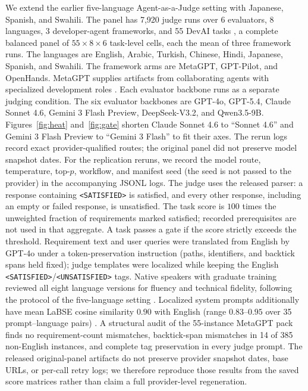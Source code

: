 \documentclass[sigconf,anonymous]{aamas}
\begin{document}
We extend the earlier five-language Agent-as-a-Judge setting
\citep{mahmood2026multilingualpromptlocalizationagentasajudge} with
Japanese, Spanish, and Swahili. The panel has 7{,}920 judge runs over 6
evaluators, 8
languages, 3 developer-agent frameworks, and 55 DevAI tasks
\citep{zhuge2024agentjudge}, a complete balanced panel of $55\times8\times6$ task-level cells, each
the mean of three framework runs.
The languages are English, Arabic, Turkish, Chinese, Hindi, Japanese,
Spanish, and Swahili. The framework arms are MetaGPT, GPT-Pilot, and
OpenHands. MetaGPT supplies artifacts from collaborating agents with
specialized development roles \citep{hong2024metagpt}. Each evaluator
backbone runs as a separate judging condition. The six
evaluator backbones are GPT-4o, GPT-5.4, Claude Sonnet 4.6,
Gemini 3 Flash Preview, DeepSeek-V3.2, and Qwen3.5-9B.
Figures~\ref{fig:heat} and~\ref{fig:gate} shorten Claude Sonnet 4.6
to ``Sonnet 4.6'' and Gemini 3 Flash Preview to ``Gemini 3 Flash'' to fit
their axes. The rerun logs record exact provider-qualified routes;
the original panel did not preserve model snapshot dates.
For the replication reruns, we record the model route, temperature, top-$p$,
workflow, and manifest seed (the seed is not passed to the provider) in the
accompanying JSONL logs. The judge uses
the released parser: a response containing \texttt{<SATISFIED>} is satisfied,
and every other response, including an empty or failed response, is
unsatisfied. The task score is $100$ times the unweighted fraction of
requirements marked satisfied; recorded prerequisites are not used in that
aggregate. A task passes a gate if the score strictly exceeds the threshold.
Requirement text and user queries were translated from English by GPT-4o under a
token-preservation instruction (paths, identifiers, and backtick spans held
fixed); judge templates were localized while keeping the English
\texttt{<SATISFIED>}/\texttt{<UNSATISFIED>} tags. Native speakers with
graduate training reviewed all eight language versions for fluency and technical
fidelity, following the protocol of the five-language setting
\citep{mahmood2026multilingualpromptlocalizationagentasajudge}. Localized
system prompts additionally have mean {LaBSE} cosine similarity $0.90$ with
English (range $0.83$--$0.95$ over 35 prompt--language pairs)
\citep{feng2022labse}. A structural audit of the 55-instance MetaGPT pack
finds no requirement-count mismatches, backtick-span mismatches in 14 of 385
non-English instances, and complete tag preservation in every judge prompt. The released original-panel artifacts do not preserve provider
snapshot dates, base URLs, or per-call retry logs; we therefore reproduce
those results from the saved score matrices rather than claim a full
provider-level regeneration.
\end{document}
